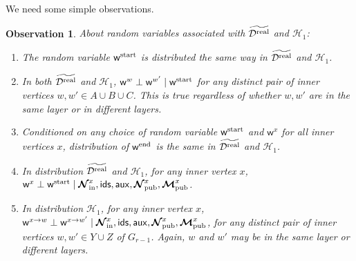\documentclass[11pt]{article}
\newtheorem{observation}[lemma]{Observation}
\theoremstyle{definition}
\newcommand{\rv}[1]{\ensuremath{{\mathsf{#1}}}\xspace}
\newcommand{\rNinner}[2]{\ensuremath{\bm{\mathcal{N}}_{\textnormal{in}}^{#1_{#2}}}}
\newcommand{\cH}{\ensuremath{\mathcal{H}}}
\newcommand{\cD}{\ensuremath{\mathcal{D}}}
\newcommand{\cDreal}{\ensuremath{\cD^{\textnormal{real}}}}
\newcommand{\cDrealtil}{\ensuremath{\widetilde{\cDreal}}}
\newcommand{\raux}{\ensuremath{\rv{aux}}}
\newcommand{\rNpub}[1]{\ensuremath{\bm{\mathcal{N}}_{\textnormal{pub}}^{#1}}}
\newcommand{\rMpub}[1]{\ensuremath{\bm{\mathcal{M}}_{\textnormal{pub}}^{#1}}}
\newcommand{\rids}{\ensuremath{\rv{ids}}}
\newcommand{\rw}{\rv{w}}
\newcommand{\rwstart}{\rv{w}^{\textnormal{start}}}
\newcommand{\rwend}{\rv{w}^{\textnormal{end}}}
\begin{document}
We need some simple observations.
\begin{observation}\label{obs:inter-hybrid-list}
About random variables associated with $\cDrealtil$ and $\cH_1$:
\begin{enumerate}[label=$(\roman*)$]
\item \label{item:hybrid1-1}	The random variable $\rwstart$ is distributed the same way in $\cDrealtil$ and $\cH_1$.
\item \label{item:hybrid1-2} In both $\cDrealtil$ and $\cH_1$, $\rw^{w} \perp \rw^{w'} \mid \rwstart$ for any distinct pair of inner vertices $w, w' \in A \cup B \cup C$. This is true regardless of whether $w, w'$ are in the same layer or in different layers. 
\item \label{item:hybrid1-3} 	Conditioned on any choice of random variable $\rwstart$ and $\rw^{x}$ for all inner vertices $x$, distribution of $\rwend$ is the same in $\cDrealtil$ and $\cH_1$. 
\item \label{item:hybrid1-4} In distribution $\cDrealtil$ and $\cH_1$, for any inner vertex $x$, $\rw^{x} \perp \rwstart \mid \rNinner{x}{}, \rids, \raux, \rNpub{x}, \rMpub{x}$. 
\item \label{item:hybrid1-5} In distribution $\cH_1$, for any inner vertex $x$, $\rw^{x\to w} \perp \rw^{x \to w'} \mid \rNinner{x}{}, \rids, \raux, \rNpub{x}, \rMpub{x}$, for any distinct pair of inner vertices $w, w' \in Y \cup Z$ of $G_{r-1}$. Again, $w$ and $w'$ may be in the same layer or different layers.
\end{enumerate}
\end{observation}
\end{document}
